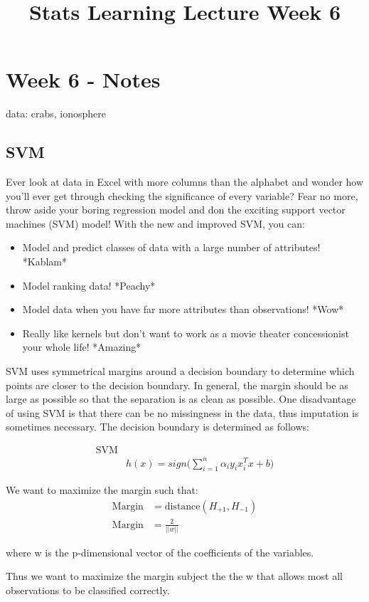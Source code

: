 \documentclass[a4paper]{article}
\title{Stats Learning Lecture Week 6}
\begin{document}
\section{Week 6 - Notes}

data: crabs, ionosphere

\subsection{SVM}
Ever look at data in Excel with more columns than the alphabet and wonder how you'll ever get through checking the significance of every variable? Fear no more, throw aside your boring regression model and don the exciting support vector machines (SVM) model! With the new and improved SVM, you can:
\begin{itemize}
\item Model and predict classes of data with a large number of attributes! *Kablam*
\item Model ranking data! *Peachy*
\item Model data when you have far more attributes than observations! *Wow*
\item Really like kernels but don't want to work as a movie theater concessionist your whole life! *Amazing*
\end{itemize}


SVM uses symmetrical margins around a decision boundary to determine which points are closer to the decision boundary. In general, the margin should be as large as possible so that the separation is as clean as possible. One disadvantage of using SVM is that there can be no missingness in the data, thus imputation is sometimes necessary. The decision boundary is determined as follows:

\begin{align*}
\text{SVM} \\
& h(x)=sign\Bigg(\sum_{i=1}^n\alpha_iy_ix^T_ix+b\Bigg)
\end{align*}

We want to maximize the margin such that:
\begin{align*}
\text{Margin}&=\text{distance}(H_{+1},H_{-1})\\
\text{Margin}&=\frac{2}{||w||}
\end{align*}

where w is the p-dimensional vector of the coefficients of the variables.

Thus we want to maximize the margin subject the the w that allows most all observations to be classified correctly. 
\end{document}

